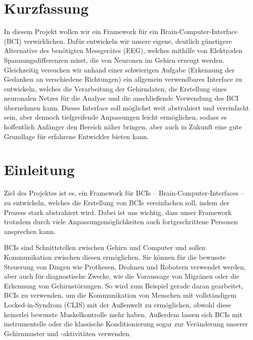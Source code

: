 \documentclass[10pt]{article}
\begin{document}
\tableofcontents

\section*{Kurzfassung}
In diesem Projekt wollen wir ein Framework für ein Brain-Computer-Interface (BCI) verwirklichen. Dafür entwickeln wir unsere eigene, deutlich günstigere Alternative des benötigten Messgerätes (EEG), welches mithilfe von Elektroden Spannungsdifferenzen misst, die von Neuronen im Gehirn erzeugt werden. Gleichzeitig versuchen wir anhand einer schwierigen Aufgabe (Erkennung der Gedanken an verschiedene Richtungen) ein allgemein verwendbares Interface zu entwickeln, welches die Verarbeitung der Gehirndaten, die Erstellung eines neuronalen Netzes für die Analyse und die anschließende Verwendung des BCI übernehmen kann. Dieses Interface soll möglichst weit abstrahiert und vereinfacht sein, aber dennoch tiefgreifende Anpassungen leicht ermöglichen, sodass es hoffentlich Anfänger den Bereich näher bringen, aber auch in Zukunft eine gute Grundlage für erfahrene Entwickler bieten kann.

\newpage


\section{Einleitung}
Ziel des Projektes ist es, ein Framework für BCIs -- Brain-Computer-Interfaces -- zu entwickeln, welches die Erstellung von BCIs vereinfachen soll, indem der Prozess stark abstrahiert wird.
Dabei ist uns wichtig, dass unser Framework trotzdem durch viele Anpassungsmöglichkeiten auch fortgeschrittene Personen ansprechen kann.

BCIs sind Schnittstellen zwischen Gehirn und Computer und sollen Kommunikation zwischen diesen ermöglichen.
Sie können für die bewusste Steuerung von Dingen wie Prothesen, Drohnen und Robotern verwendet werden, aber auch für diagnostische Zwecke, wie die Voraussage von Migränen oder die Erkennung von Gehirnstörungen.
So wird zum Beispiel gerade daran gearbeitet, BCIs zu verwenden, um die Kommunikation von Menschen mit vollständigem Locked-in-Syndrom (CLIS) mit der Außenwelt zu ermöglichen, obwohl diese keinerlei bewusste Muskelkontrolle mehr haben. \cite{BCIChaudhary}
Außerdem lassen sich BCIs mit instrumentelle oder die klassische Konditionierung sogar zur Veränderung unserer Gehirnmuster und -aktivitäten verwenden. \cite{BCIChaudhary}
\end{document}
